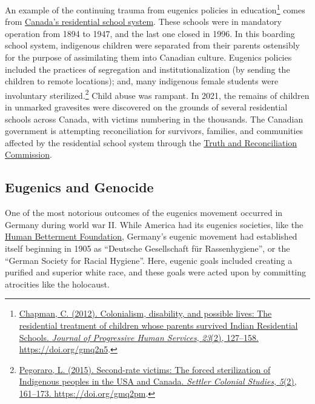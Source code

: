 \documentclass[
  oneside,
  12pt]{crumpbook}
\begin{document}
An example of the continuing trauma from eugenics policies in education\footnote{\protect\hyperlink{ref-chapmanColonialismDisabilityPossible2012}{Chapman, C. (2012). Colonialism, disability, and possible lives: {The} residential treatment of children whose parents survived {Indian Residential Schools}. \emph{Journal of Progressive Human Services}, \emph{23}(2), 127--158. \url{https://doi.org/gmq2n5}}.} comes from \href{https://en.wikipedia.org/wiki/Canadian_Indian_residential_school_system}{Canada's residential school system}. These schools were in mandatory operation from 1894 to 1947, and the last one closed in 1996. In this boarding school system, indigenous children were separated from their parents ostensibly for the purpose of assimilating them into Canadian culture. Eugenics policies included the practices of segregation and institutionalization (by sending the children to remote locations); and, many indigenous female students were involuntary sterilized.\footnote{\protect\hyperlink{ref-pegoraroSecondrateVictimsForced2015}{Pegoraro, L. (2015). Second-rate victims: {The} forced sterilization of {Indigenous} peoples in the {USA} and {Canada}. \emph{Settler Colonial Studies}, \emph{5}(2), 161--173. \url{https://doi.org/gmq2pm}}.} Child abuse was rampant. In 2021, the remains of children in unmarked gravesites were discovered on the grounds of several residential schools across Canada, with victims numbering in the thousands. The Canadian government is attempting reconciliation for survivors, families, and communities affected by the residential school system through the \href{https://www.rcaanc-cirnac.gc.ca/eng/1450124405592/1529106060525}{Truth and Reconciliation Commission}.

\hypertarget{eugenics-and-genocide}{%
\subsection{Eugenics and Genocide}\label{eugenics-and-genocide}}

One of the most notorious outcomes of the eugenics movement occurred in Germany during world war II. While America had its eugenics societies, like the \href{https://en.wikipedia.org/wiki/Human_Betterment_Foundation}{Human Betterment Foundation}, Germany's eugenic movement had established itself beginning in 1905 as ``Deutsche Gesellschaft für Rassenhygiene'', or the ``German Society for Racial Hygiene''. Here, eugenic goals included creating a purified and superior white race, and these goals were acted upon by committing atrocities like the holocaust.
\end{document}
